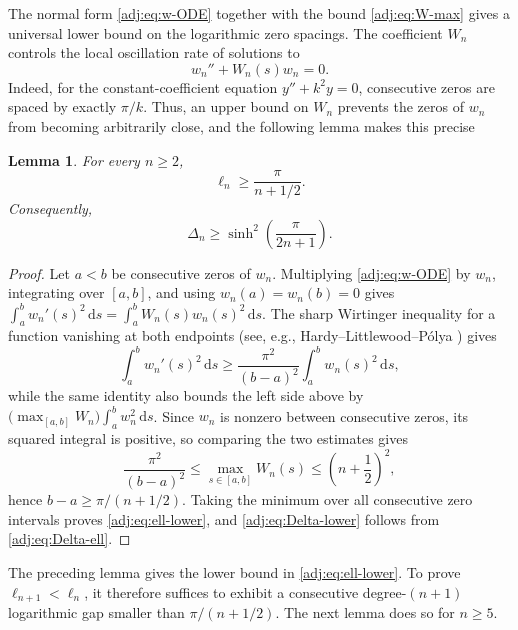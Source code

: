 \documentclass[11pt]{article}
\numberwithin{equation}{section}
\newtheorem{lemma}[theorem]{Lemma}
\theoremstyle{definition}
\theoremstyle{remark}
\newcommand{\dd}{\,\mathrm d}
\begin{document}
The normal form \eqref{adj:eq:w-ODE} together with the bound
\eqref{adj:eq:W-max} gives a universal lower bound on the logarithmic zero
spacings. The coefficient $W_n$ controls the local oscillation rate of
solutions to
$$
w_n''+W_n(s)w_n=0.
$$
Indeed, for the constant-coefficient equation $y''+k^2y=0$, consecutive zeros
are spaced by exactly $\pi/k$. Thus, an upper bound on $W_n$ prevents the zeros
of $w_n$ from becoming arbitrarily close, and the following lemma makes this precise

\begin{lemma}\label{adj:lem:gap-lower}
For every $n\geq2$,
\begin{equation}\label{adj:eq:ell-lower}
 \ell_n\geq\frac{\pi}{n+1/2}.
\end{equation}
Consequently,
\begin{equation}\label{adj:eq:Delta-lower}
 \Delta_n\geq
 \sinh^2\left(\frac{\pi}{2n+1}\right).
\end{equation}
\end{lemma}

\begin{proof}
Let $a<b$ be consecutive zeros of $w_n$. Multiplying \eqref{adj:eq:w-ODE} by $w_n$, integrating over $[a,b]$, and using $w_n(a)=w_n(b)=0$ gives $\int_a^b w_n'(s)^2\dd s=\int_a^b W_n(s)w_n(s)^2\dd s$. The sharp Wirtinger inequality for a function vanishing at both endpoints (see, e.g., Hardy--Littlewood--P\'olya \cite[Ch.~VII, \S7.7, Eq.~(7.7.1)]{hardylittlewoodpolya1952}) gives
\[
 \int_a^b w_n'(s)^2\dd s
 \geq\frac{\pi^2}{(b-a)^2}
 \int_a^b w_n(s)^2\dd s,
\]
while the same identity also bounds the left side above by $\bigl(\max_{[a,b]}W_n\bigr)\int_a^b w_n^2\dd s$. Since $w_n$ is nonzero between consecutive zeros, its squared integral is positive, so comparing the two estimates gives
\begin{equation}\label{adj:eq:intervalwise-gap}
 \frac{\pi^2}{(b-a)^2}
 \leq \max_{s\in[a,b]}W_n(s)
 \leq\left(n+\frac12\right)^2,
\end{equation}
hence $b-a\geq\pi/(n+1/2)$. Taking the minimum over all consecutive zero intervals proves \eqref{adj:eq:ell-lower}, and \eqref{adj:eq:Delta-lower} follows from \eqref{adj:eq:Delta-ell}.
\end{proof}

The preceding lemma gives the lower bound
in \eqref{adj:eq:ell-lower}. To prove $\ell_{n+1}<\ell_n$, it therefore suffices to exhibit a consecutive degree-$(n+1)$ logarithmic gap smaller than $\pi/(n+1/2)$. The next lemma does so for $n\geq5$.
\end{document}

